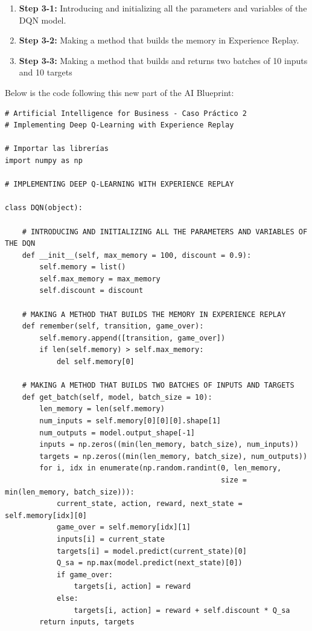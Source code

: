 \documentclass[]{book}
\begin{document}
\begin{enumerate}
    \item \textbf{Step 3-1:} Introducing and initializing all the parameters and variables of the DQN model.
    \item \textbf{Step 3-2:} Making a method that builds the memory in Experience Replay.
    \item \textbf{Step 3-3:} Making a method that builds and returns two batches of 10 inputs and 10 targets
\end{enumerate}

Below is the code following this new part of the AI Blueprint:

\begin{lstlisting}
# Artificial Intelligence for Business - Caso Práctico 2
# Implementing Deep Q-Learning with Experience Replay

# Importar las librerías
import numpy as np

# IMPLEMENTING DEEP Q-LEARNING WITH EXPERIENCE REPLAY

class DQN(object):
    
    # INTRODUCING AND INITIALIZING ALL THE PARAMETERS AND VARIABLES OF THE DQN
    def __init__(self, max_memory = 100, discount = 0.9):
        self.memory = list()
        self.max_memory = max_memory
        self.discount = discount

    # MAKING A METHOD THAT BUILDS THE MEMORY IN EXPERIENCE REPLAY
    def remember(self, transition, game_over):
        self.memory.append([transition, game_over])
        if len(self.memory) > self.max_memory:
            del self.memory[0]

    # MAKING A METHOD THAT BUILDS TWO BATCHES OF INPUTS AND TARGETS
    def get_batch(self, model, batch_size = 10):
        len_memory = len(self.memory)
        num_inputs = self.memory[0][0][0].shape[1]
        num_outputs = model.output_shape[-1]
        inputs = np.zeros((min(len_memory, batch_size), num_inputs))
        targets = np.zeros((min(len_memory, batch_size), num_outputs))
        for i, idx in enumerate(np.random.randint(0, len_memory,
                                                  size = min(len_memory, batch_size))):
            current_state, action, reward, next_state = self.memory[idx][0]
            game_over = self.memory[idx][1]
            inputs[i] = current_state
            targets[i] = model.predict(current_state)[0]
            Q_sa = np.max(model.predict(next_state)[0])
            if game_over:
                targets[i, action] = reward
            else:
                targets[i, action] = reward + self.discount * Q_sa
        return inputs, targets
\end{lstlisting}
\end{document}
